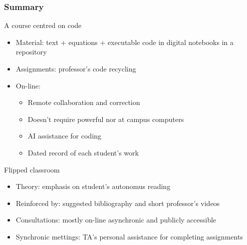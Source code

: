 \documentclass[aspectratio=169]{beamer}
\begin{document}
\begin{frame}
	\frametitle{Summary}
	\begin{block}{A course centred on code}
		\begin{itemize}%
			\item Material: text + equations + executable code in digital notebooks in a repository
			\item Assignments: professor's code recycling
			\item On-line:
			\begin{itemize}%
				\item Remote collaboration and correction
				\item Doesn't require powerful nor at campus computers
				\item AI assistance for coding
				\item Dated record of each student's work
			\end{itemize}
		\end{itemize}
	\end{block}
	\begin{block}{Flipped classroom}
		\begin{itemize}%
			\item Theory: emphasis on student's autonomus reading
			\item Reinforced by: suggested bibliography and short professor's videos
			\item Consultations: mostly on-line asynchronic and publicly accessible
			\item Synchronic mettings: TA's personal assistance for completing assignments
		\end{itemize}
	\end{block}
\end{frame}
\end{document}
